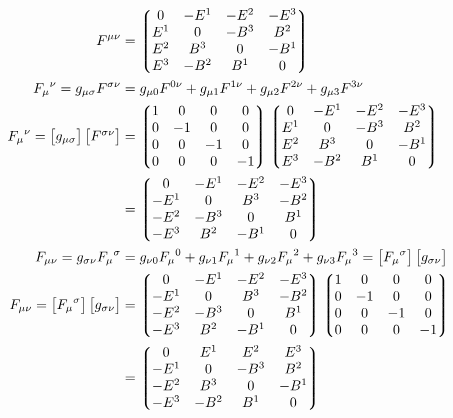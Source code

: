 \documentclass{article}
\begin{document}
\begin{align*}
  F^{\mu\nu}                                             & =\Pmqty{0                                                                                                            & -E^1 & -E^2 & -E^3 \\E^1 &0 & -B^3 & B^2\\E^2 & B^3 &0 & -B^1\\E^3 & -B^2 & B^1 &0\\}\\
  {F_\mu}^\nu=g_{\mu\sigma}F^{\sigma\nu}                 & =g_{\mu0}F^{0\nu}+g_{\mu1}F^{1\nu}+g_{\mu2}F^{2\nu}+g_{\mu3}F^{3\nu}                                                                      \\
  {F_\mu}^\nu=\bmqty{g_{\mu\sigma}}\bmqty{F^{\sigma\nu}} & =\Pmqty{1                                                                                                            & 0    & 0    & 0    \\0&-1&0&0\\0&0&-1&0\\0&0&0&-1}\Pmqty{0 & -E^1 & -E^2 & -E^3 \\E^1 &0 & -B^3 & B^2\\E^2 & B^3 &0 & -B^1\\E^3 & -B^2 & B^1 &0\\}\\
                                                         & =\Pmqty{0                                                                                                            & -E^1 & -E^2 & -E^3 \\-E^1 &0&B^3&-B^2\\-E^2 & -B^3 &0 & B^1\\-E^3 & B^2 & -B^1 &0\\} \\
  F_{\mu\nu}=g_{\sigma\nu}{F_\mu}^\sigma                 & =g_{\nu0}{F_\mu}^0+g_{\nu1}{F_\mu}^1+g_{\nu2}{F_\mu}^2+g_{\nu3}{F_\mu}^3=\bmqty{{F_\mu}^\sigma}\bmqty{g_{\sigma\nu}}                      \\
  F_{\mu\nu}=\bmqty{{F_\mu}^\sigma}\bmqty{g_{\sigma\nu}} & =\Pmqty{0                                                                                                            & -E^1 & -E^2 & -E^3 \\-E^1 &0&B^3&-B^2\\-E^2 & -B^3 &0 & B^1\\-E^3 & B^2 & -B^1 &0\\}\Pmqty{1 & 0    & 0    & 0    \\0&-1&0&0\\0&0&-1&0\\0&0&0&-1} \\
                                                         & =\Pmqty{0                                                                                                            & E^1  & E^2  & E^3  \\-E^1 &0&-B^3&B^2\\-E^2 & B^3 &0 &-B^1\\-E^3 &-B^2 & B^1 &0\\} \\
\end{align*}
\end{document}

